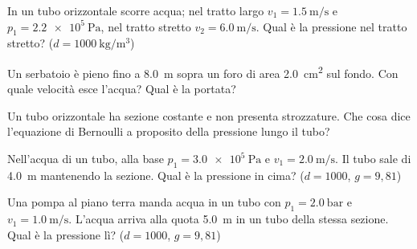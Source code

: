 \begin{esercizio}
In un tubo orizzontale scorre acqua; nel tratto largo $v_1 = \SI{1,5}{\metre\per\second}$ e $p_1 = \SI{2,2e5}{\pascal}$, nel tratto stretto $v_2 = \SI{6,0}{\metre\per\second}$. Qual è la pressione nel tratto stretto? ($d = \SI{1000}{\kilogram\per\metre\cubed}$)\\
\end{esercizio}

\begin{esercizio}
Un serbatoio è pieno fino a \SI{8,0}{\metre} sopra un foro di area \SI{2,0}{\centi\metre\squared} sul fondo. Con quale velocità esce l'acqua? Qual è la portata?\\
\end{esercizio}

\begin{esercizio}
Un tubo orizzontale ha sezione costante e non presenta strozzature. Che cosa dice l'equazione di Bernoulli a proposito della pressione lungo il tubo?\\
\end{esercizio}

\begin{esercizio}
Nell'acqua di un tubo, alla base $p_1 = \SI{3,0e5}{\pascal}$ e $v_1 = \SI{2,0}{\metre\per\second}$. Il tubo sale di \SI{4,0}{\metre} mantenendo la sezione. Qual è la pressione in cima? ($d = 1000$, $g = 9{,}81$)\\
\end{esercizio}

\begin{esercizio}
Una pompa al piano terra manda acqua in un tubo con $p_1 = \SI{2,0}{\bar}$ e $v_1 = \SI{1,0}{\metre\per\second}$. L'acqua arriva alla quota \SI{5,0}{\metre} in un tubo della stessa sezione. Qual è la pressione lì? ($d = 1000$, $g = 9{,}81$)\\
\end{esercizio}

